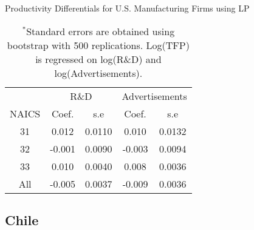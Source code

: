 \documentclass[12pt]{article}
\begin{document}
\begin{appendices}
\begin{table}[H]
\centering
\caption{Productivity Differentials for U.S. Manufacturing Firms using LP}
\small
\begin{tabular}{ccccc}
  \hline\hline & \multicolumn{2}{c}{R\&D}  & \multicolumn{2}{c}{Advertisements} \\ \cmidrule(lr){2-3} \cmidrule(lr){4-5}NAICS & Coef. & s.e & Coef. & s.e \\ 
  \hline
31 & 0.012 & 0.0110 & 0.010 & 0.0132 \\ 
  32 & -0.001 & 0.0090 & -0.003 & 0.0094 \\ 
  33 & 0.010 & 0.0040 & 0.008 & 0.0036 \\ 
  All & -0.005 & 0.0037 & -0.009 & 0.0036 \\ 
   \hline
\end{tabular}
\caption*{\footnotesize $^{*}$Standard errors are obtained using bootstrap with 500 replications. Log(TFP) is regressed on log(R\&D) and log(Advertisements).}
\label{LPUSTFPP}
\end{table}

\subsection{Chile}


\end{appendices}
\end{document}
